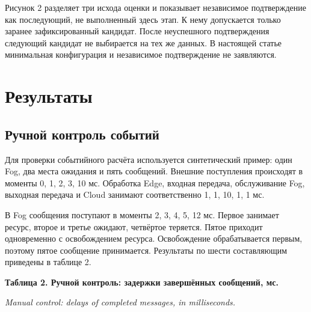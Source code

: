 Рисунок 2 разделяет три исхода оценки и показывает независимое подтверждение как последующий, не выполненный здесь этап. К нему допускается только заранее зафиксированный кандидат. После неуспешного подтверждения следующий кандидат не выбирается на тех же данных. В настоящей статье минимальная конфигурация и независимое подтверждение не заявляются.

\hypertarget{ux440ux435ux437ux443ux43bux44cux442ux430ux442ux44b}{%
\FloatBarrier
\section{Результаты}}

\hypertarget{ux440ux443ux447ux43dux43eux439-ux43aux43eux43dux442ux440ux43eux43bux44c-ux441ux43eux431ux44bux442ux438ux439}{%
\subsection{Ручной контроль событий}}

Для проверки событийного расчёта используется синтетический пример: один Fog, два места ожидания и пять сообщений. Внешние поступления происходят в моменты 0, 1, 2, 3, 10 мс. Обработка Edge, входная передача, обслуживание Fog, выходная передача и Cloud занимают соответственно 1, 1, 10, 1, 1 мс.

В Fog сообщения поступают в моменты 2, 3, 4, 5, 12 мс. Первое занимает ресурс, второе и третье ожидают, четвёртое теряется. Пятое приходит одновременно с освобождением ресурса. Освобождение обрабатывается первым, поэтому пятое сообщение принимается. Результаты по шести составляющим приведены в таблице 2.

\textbf{Таблица 2. Ручной контроль: задержки завершённых сообщений, мс.}

\emph{Manual control: delays of completed messages, in milliseconds.}

